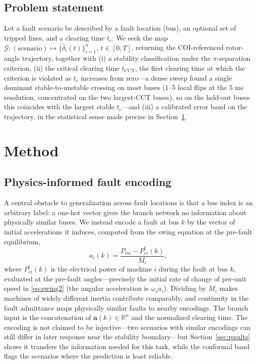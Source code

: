 \documentclass[5p,times]{elsarticle}
\begin{document}
\subsection{Problem statement}
Let a fault scenario be described by a fault location (bus), an optional set of tripped lines, and
a clearing time $t_c$. We seek the map
$\mathcal{G}\colon(\text{scenario})\mapsto\{\tilde\delta_i(t)\}_{i=1}^{n}$, $t\in[0,T]$,
returning the COI-referenced rotor-angle trajectory, together with (i) a stability
classification under the $\pi$-separation criterion, (ii) the critical clearing time
$t_{\mathrm{CCT}}$, the first clearing time at which the criterion is violated as $t_c$
increases from zero---a dense sweep found a single dominant stable-to-unstable crossing on most
buses (1--5 local flips at the $5$ ms resolution, concentrated on the two largest-CCT buses), so
on the held-out buses this coincides with the largest stable $t_c$---and (iii) a calibrated error
band on the trajectory, in the statistical sense made precise in Section~\ref{sec:method}.

\section{Method}
\label{sec:method}

\subsection{Physics-informed fault encoding}
A central obstacle to generalization across fault locations is that a bus index is an arbitrary
label: a one-hot vector gives the branch network no information about physically similar buses. We instead encode a fault at bus $k$ by the vector of
initial accelerations it induces, computed from the swing equation at the pre-fault equilibrium,
\begin{equation}
a_i(k) = \frac{P_{mi} - P_{ei}^{\mathrm{f}}(k)}{M_i},
\label{eq:severity}
\end{equation}
where $P_{ei}^{\mathrm{f}}(k)$ is the electrical power of machine $i$ during the fault at bus
$k$, evaluated at the pre-fault angles---precisely the initial rate of change of per-unit speed in
\eqref{eq:swing2} (the angular acceleration is $\omega_s a_i$). Dividing by $M_i$ makes machines
of widely different inertia contribute comparably, and continuity in the fault admittance maps
physically similar faults to nearby encodings. The branch input is the concatenation of
$\bm{a}(k)\in\mathbb{R}^n$ and the normalized clearing time. The encoding is not claimed to be
injective---two scenarios with similar encodings can still differ in later response near the
stability boundary---but Section~\ref{sec:results} shows it transfers the information needed for
this task, while the conformal band flags the scenarios where the prediction is least reliable.
\end{document}
